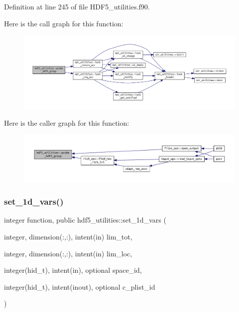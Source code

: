 Definition at line 245 of file H\+D\+F5\+\_\+utilities.\+f90.

Here is the call graph for this function\+:
\nopagebreak
\begin{figure}[H]
\begin{center}
\leavevmode
\includegraphics[width=350pt]{namespacehdf5__utilities_ae4e6c96512460a0ede8dc5b1a43681e8_cgraph}
\end{center}
\end{figure}
Here is the caller graph for this function\+:
\nopagebreak
\begin{figure}[H]
\begin{center}
\leavevmode
\includegraphics[width=350pt]{namespacehdf5__utilities_ae4e6c96512460a0ede8dc5b1a43681e8_icgraph}
\end{center}
\end{figure}
\mbox{\label{namespacehdf5__utilities_a7574320980affc30a584f7776d33a51c}} 
\subsubsection{\texorpdfstring{set\+\_\+1d\+\_\+vars()}{set\_1d\_vars()}}
{\footnotesize\ttfamily integer function, public hdf5\+\_\+utilities\+::set\+\_\+1d\+\_\+vars (\begin{DoxyParamCaption}\item[{integer, dimension(\+:,\+:), intent(in)}]{lim\+\_\+tot,  }\item[{integer, dimension(\+:,\+:), intent(in)}]{lim\+\_\+loc,  }\item[{integer(hid\+\_\+t), intent(in), optional}]{space\+\_\+id,  }\item[{integer(hid\+\_\+t), intent(inout), optional}]{c\+\_\+plist\+\_\+id }\end{DoxyParamCaption})}



